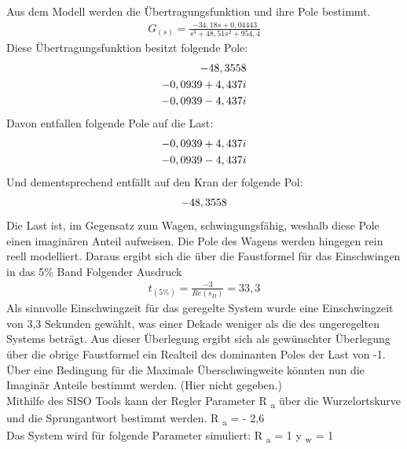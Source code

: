 \documentclass[10pt]{scrartcl}
\begin{document}
Aus dem Modell werden die Übertragungsfunktion und ihre Pole bestimmt.
\begin{align}
   G_{(s)}=\frac{-34,18s+0,04443}{s^3+48,51s^2+954,4}
\end{align}
Diese Übertragungsfunktion besitzt folgende Pole:
\begin{align}
-48,3558 \notag \\
-0,0939+4,437i  \notag \\
-0,0939-4,437i \notag 
 \end{align} 
Davon entfallen folgende Pole auf die Last: 
\begin{align}
-0,0939+4,437i  \notag \\
-0,0939-4,437i  \notag 
\end{align}
Und dementsprechend entfällt auf den Kran der folgende Pol:
\begin{align}
-48,3558  \notag 
\end{align}
Die Last ist, im Gegensatz zum Wagen, schwingungsfähig, weshalb diese Pole einen imaginären Anteil aufweisen. Die Pole des Wagens werden hingegen rein reell modelliert. 
Daraus ergibt sich die über die Faustformel für das Einschwingen in das 5\% Band Folgender Ausdruck
\begin{align}
t_{(5\%)}=\frac{-3}{Re(s_D)}=33,3
\end{align}
 Als sinnvolle Einschwingzeit für das geregelte System wurde eine Einschwingzeit von  3,3 Sekunden gewählt, was einer Dekade weniger als die des ungeregelten Systems beträgt. Aus dieser Überlegung ergibt sich als gewünschter Überlegung über die obrige Faustformel ein Realteil des dominanten Poles der Last von -1. Über eine Bedingung für die Maximale Überschwingweite könnten nun die Imaginär Anteile bestimmt werden. (Hier nicht gegeben.) \\
Mithilfe des SISO Tools kann der Regler Parameter R \textsubscript{a}
über die Wurzelortskurve und die Sprungantwort bestimmt werden.
R \textsubscript{a} = - 2,6 \\
Das System wird für folgende Parameter simuliert:
R \textsubscript{a} = 1
 y \textsubscript{w} = 1\\
\end{document}
